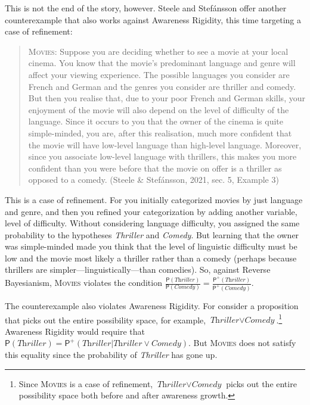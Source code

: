 \documentclass[
  11pt,
  dvipsnames,enabledeprecatedfontcommands]{scrartcl}
\newcommand{\pr}[1]{\ensuremath{\mathsf{P}(#1)}}
\newcommand{\ppr}[2]{\ensuremath{\mathsf{P}^{#1}(#2)}}
\begin{document}
This is not the end of the story, however. Steele and Stefánsson offer
another counterexample that also works against Awareness Rigidity, this
time targeting a case of refinement:

\begin{quote}
\textsc{Movies}: Suppose you are deciding whether to see a movie at your
local cinema. You know that the movie's predominant language and genre
will affect your viewing experience. The possible languages you consider
are French and German and the genres you consider are thriller and
comedy. But then you realise that, due to your poor French and German
skills, your enjoyment of the movie will also depend on the level of
difficulty of the language. Since it occurs to you that the owner of the
cinema is quite simple-minded, you are, after this realisation, much
more confident that the movie will have low-level language than
high-level language. Moreover, since you associate low-level language
with thrillers, this makes you more confident than you were before that
the movie on offer is a thriller as opposed to a comedy. (Steele \&
Stefánsson, 2021, sec. 5, Example 3)
\end{quote}

\doublespace

\noindent This is a case of refinement. For you initially categorized
movies by just language and genre, and then you refined your
categorization by adding another variable, level of difficulty. Without
considering language difficulty, you assigned the same probability to
the hypotheses \textit{Thriller} and \textit{Comedy}. But learning that
the owner was simple-minded made you think that the level of linguistic
difficulty must be low and the movie most likely a thriller rather than
a comedy (perhaps because thrillers are simpler---linguistically---than
comedies). So, against Reverse Bayesianism, \textsc{Movies} violates the
condition
\(\frac{\pr{\textit{Thriller}}}{\pr{\textit{Comedy}}}=\frac{\ppr{+}{\textit{Thriller}}}{\ppr{+}{\textit{Comedy}}}\).

The counterexample also violates Awareness Rigidity. For consider a
proposition that picks out the entire possibility space, for example,
\(\textit{Thriller}\vee \textit{Comedy}\).\footnote{Since
  \textsc{Movies} is a case of refinement,
  \(\textit{Thriller}\vee \textit{Comedy}\) picks out the entire
  possibility space both before and after awareness growth.} Awareness
Rigidity would require that
\(\pr{\textit{Thriller}}=\ppr{+}{\textit{Thriller} \vert \textit{Thriller}\vee \textit{Comedy}}\).
But \textsc{Movies} does not satisfy this equality since the probability
of \textit{Thriller} has gone up.
\end{document}
